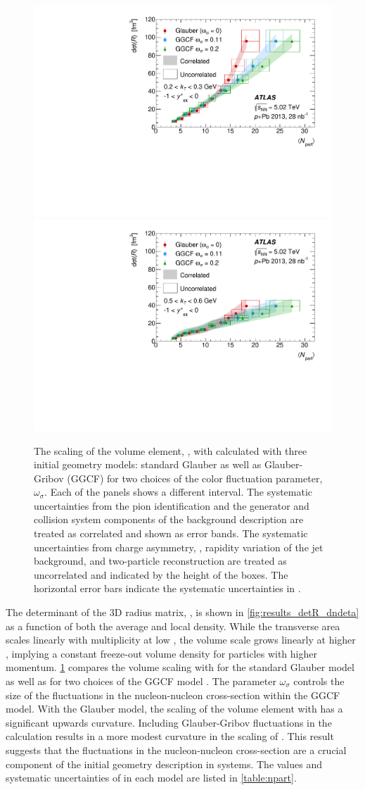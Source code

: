 \begin{figure}[t]
\centering
\includegraphics[width=0.49\linewidth]{canqosl_detR_kt1_ggcf.pdf}
\includegraphics[width=0.49\linewidth]{canqosl_detR_kt4_ggcf.pdf}\\
\caption{The scaling of the volume element, \detR, with \avgNpart calculated with three initial geometry models: standard Glauber as well as Glauber-Gribov (GGCF) for two choices of the color fluctuation parameter, $\omega_\sigma$.
Each of the panels shows a different \kt interval.
The systematic uncertainties from the pion identification and the generator and collision system components of the background description are treated as correlated and shown as error bands.
The systematic uncertainties from charge asymmetry, \Reff, rapidity variation of the jet background, and two-particle reconstruction are treated as uncorrelated and indicated by the height of the boxes.
The horizontal error bars indicate the systematic uncertainties in \avgNpart.}
\label{fig:results_detR_ggcf}
\end{figure}

The determinant of the 3D radius matrix, \detR, is shown in \cref{fig:results_detR_dndeta} as a function of both the average and local density.
While the transverse area scales linearly with  multiplicity at low \kt, the volume scale grows linearly at higher \kt, implying a constant freeze-out volume density for particles with higher momentum.
\cref{fig:results_detR_ggcf} compares the volume scaling with \avgNpart for the standard Glauber model as well as for two choices of the \ac{GGCF} model \cite{Alvioli:2013vk}.
The parameter $\omega_{\sigma}$ controls the size of the fluctuations in the nucleon-nucleon cross-section within the \ac{GGCF} model.
With the Glauber model, the scaling of the volume element with \avgNpart has a significant upwards curvature.
Including Glauber-Gribov fluctuations in the \avgNpart calculation results in a more modest curvature in the scaling of \detR.
This result suggests that the fluctuations in the nucleon-nucleon cross-section are a crucial component of the initial geometry description in \pPb systems.
The values and systematic uncertainties of \avgNpart in each model are listed in \cref{table:npart}.


